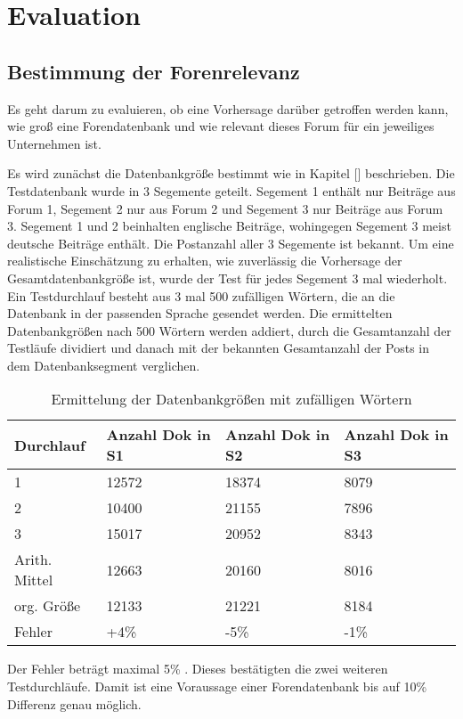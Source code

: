 \section{Evaluation}
\subsection{Bestimmung der Forenrelevanz}

Es geht darum zu evaluieren, ob eine Vorhersage darüber getroffen werden kann, wie groß eine Forendatenbank und wie relevant dieses Forum für ein jeweiliges Unternehmen ist.

Es wird zunächst die Datenbankgröße bestimmt wie in Kapitel [] beschrieben. Die Testdatenbank wurde in 3 Segemente geteilt. Segement 1 enthält nur Beiträge aus Forum 1, Segement 2 nur aus Forum 2 und Segement 3 nur Beiträge aus Forum 3. 
Segement 1 und 2 beinhalten englische Beiträge, wohingegen Segement 3 meist deutsche Beiträge enthält. Die Postanzahl aller 3 Segemente ist bekannt. Um eine realistische Einschätzung zu erhalten, wie zuverlässig die Vorhersage der Gesamtdatenbankgröße ist, wurde der Test für jedes Segement 3 mal wiederholt. Ein Testdurchlauf besteht aus 3 mal 500 zufälligen Wörtern, die an die Datenbank in der passenden Sprache gesendet werden. Die ermittelten Datenbankgrößen nach 500 Wörtern werden addiert, durch die Gesamtanzahl der Testläufe dividiert und danach mit der bekannten Gesamtanzahl der Posts in dem Datenbanksegment verglichen.

\begin{table}[h!]
\begin{tabular}{ | p{3cm} | p{3cm} | p{3cm}| p{3cm} |} \hline
Durchlauf & Anzahl Dok in S1 & Anzahl Dok in S2 & Anzahl Dok in S3 \\ \hline
1 & 12572 & 18374 & 8079 \\ \hline
2 & 10400 & 21155 & 7896 \\ \hline
3 & 15017 & 20952 & 8343 \\ \hline
Arith. Mittel & 12663 & 20160 & 8016 \\ \hline
org. Größe & 12133 & 21221 & 8184 \\ \hline
Fehler & +4\% & -5\% & -1\% \\ \hline
\end{tabular}
\caption{Ermittelung der Datenbankgrößen mit zufälligen Wörtern}
\end{table}

Der Fehler beträgt maximal 5\% . Dieses bestätigten die zwei weiteren Testdurchläufe. Damit ist eine Voraussage einer Forendatenbank bis auf 10\% Differenz genau möglich.

